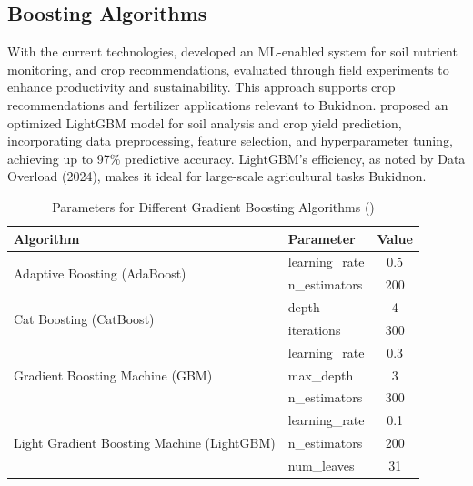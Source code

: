 {	\subsection{Boosting Algorithms}
	
	With the current technologies, \cite{Islam2023} developed an ML-enabled system for soil nutrient monitoring, and crop recommendations, evaluated through field experiments to enhance productivity and sustainability. This approach supports crop recommendations and fertilizer applications relevant to Bukidnon. \cite{Parganiha2024} proposed an optimized LightGBM model for soil analysis and crop yield prediction, incorporating data preprocessing, feature selection, and hyperparameter tuning, achieving up to 97\% predictive accuracy. LightGBM’s efficiency, as noted by Data Overload (2024), makes it ideal for large-scale agricultural tasks Bukidnon.
	
	\pagebreak
	
	\begin{table}[ht]
		\centering
		\caption{Parameters for Different Gradient Boosting Algorithms (\textit{\cite{Salvador2024}})}
		\label{tab:BoostingAlgorithms}
		\renewcommand{\arraystretch}{1.2}
		
		\begin{tabular}{l l c}
			\toprule
			\textbf{Algorithm} & \textbf{Parameter} & \textbf{Value} \\
			\midrule
			
			\multirow{2}{*}{Adaptive Boosting (AdaBoost)} 
			& learning\_rate & 0.5 \\
			& n\_estimators & 200 \\
			
			\midrule
			
			\multirow{2}{*}{Cat Boosting (CatBoost)} 
			& depth & 4 \\
			& iterations & 300 \\
			
			\midrule
			
			\multirow{3}{*}{Gradient Boosting Machine (GBM)} 
			& learning\_rate & 0.3 \\
			& max\_depth & 3 \\
			& n\_estimators & 300 \\
			
			\midrule
			
			\multirow{3}{*}{Light Gradient Boosting Machine (LightGBM)} 
			& learning\_rate & 0.1 \\
			& n\_estimators & 200 \\
			& num\_leaves & 31 \\
			

\end{tabular}
\end{table}}
